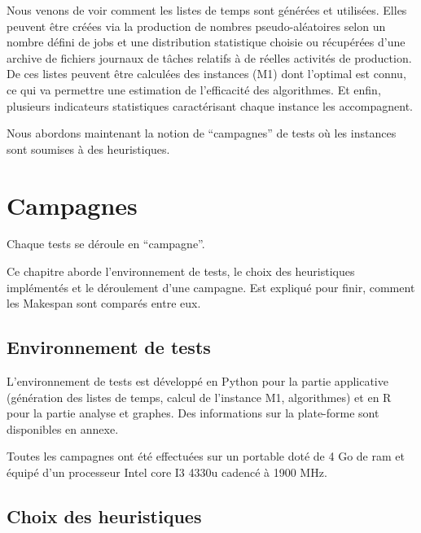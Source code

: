 \documentclass[a4paper,12pt]{report}
\theoremstyle{plain}				%
\theoremstyle{definition}				%
\begin{document}
\bigskip
Nous venons de voir comment les listes de temps sont générées et utilisées. 
Elles peuvent être créées via la production de nombres pseudo-aléatoires selon un nombre 
  défini de jobs et une distribution statistique choisie 
  ou récupérées d'une archive de fichiers journaux de tâches relatifs à de réelles 
  activités de production.
De ces listes peuvent être calculées des instances (M1) dont l'optimal est connu, 
  ce qui va permettre une estimation de l'efficacité des algorithmes.
Et enfin, plusieurs indicateurs statistiques caractérisant chaque instance les accompagnent.

Nous abordons maintenant la notion de ``campagnes'' de tests où les instances sont soumises à des heuristiques.  

\section{Campagnes} \label{sec:Campagnes}

Chaque tests se déroule en ``campagne''. 

Ce chapitre aborde l’environnement de tests, le choix des heuristiques implémentés et le déroulement d'une campagne. Est expliqué pour finir, comment les Makespan sont comparés entre eux.

\subsection{Environnement de tests} \label{ssec:campagnesEnvironnementDeTests}

L'environnement de tests est développé 
  en Python pour la partie applicative 
  (génération des listes de temps, calcul de l'instance M1, algorithmes) et 
  en R pour la partie analyse et graphes. 
Des informations sur la plate-forme sont disponibles en annexe.

Toutes les campagnes ont été effectuées sur un portable 
  doté de 4 Go de ram et 
  équipé d'un processeur Intel core I3 4330u cadencé à 1900 MHz.


\subsection{Choix des heuristiques} \label{campagneChoisHeuristiques}
\end{document}

